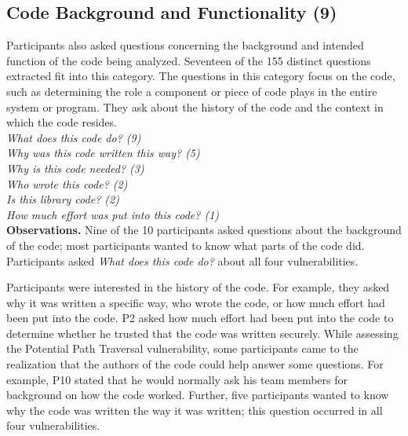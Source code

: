 \documentclass[conference]{IEEEtran}
\begin{document}


\noindent\subsection{\textbf{Code Background and Functionality (9)}}
\label{cbf}
Participants also asked questions concerning the background and intended function of the code being analyzed. 
Seventeen of the 155 distinct questions extracted fit into this category. 
The questions in this category focus on the code, such as determining the role a component or piece of code plays in the entire system or program.
They ask about the history of the code and the context in which the code resides.
\\

\noindent\emph{What does this code do? (9)} \\
\emph{Why was this code written this way? (5)} \\
\emph{Why is this code needed? (3)} \\
\emph{Who wrote this code? (2)} \\
\emph{Is this library code? (2)} \\
\emph{How much effort was put into this code? (1)} \\



\noindent\textbf{Observations.}
Nine of the 10 participants asked questions about the background of the code; most participants wanted to know what parts of the code did.
Participants asked \textit{What does this code do?} about all four vulnerabilities.

Participants were interested in the history of the code.
For example, they asked why it was written a specific way, who wrote the code, or how much effort had been put into the code.
P2 asked how much effort had been put into the code to determine whether he trusted that the code was written securely.
While assessing the Potential Path Traversal vulnerability, some participants came to the realization that the authors of the code could help answer some questions. 
For example, P10 stated that he would normally ask his team members for background on how the code worked.
Further, five participants wanted to know why the code was written the way it was written; this question occurred in all four vulnerabilities.
\\
\end{document}
